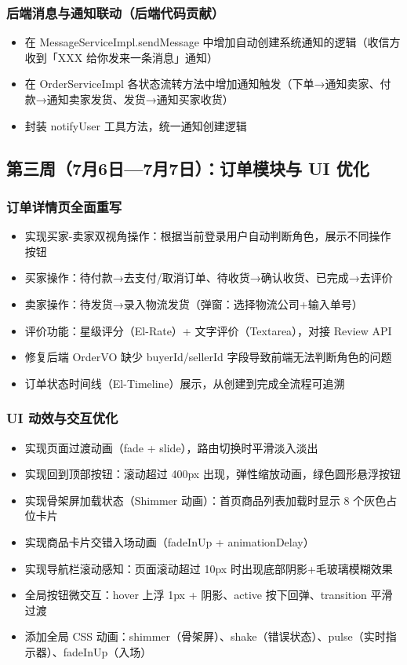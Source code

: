 \documentclass[12pt,a4paper]{ctexart}
\begin{document}
\subsubsection*{后端消息与通知联动（后端代码贡献）}
\begin{itemize}
    \item 在 MessageServiceImpl.sendMessage 中增加自动创建系统通知的逻辑（收信方收到「XXX 给你发来一条消息」通知）
    \item 在 OrderServiceImpl 各状态流转方法中增加通知触发（下单→通知卖家、付款→通知卖家发货、发货→通知买家收货）
    \item 封装 notifyUser 工具方法，统一通知创建逻辑
\end{itemize}

\subsection{第三周（7月6日—7月7日）：订单模块与 UI 优化}

\subsubsection*{订单详情页全面重写}
\begin{itemize}
    \item 实现买家-卖家双视角操作：根据当前登录用户自动判断角色，展示不同操作按钮
    \item 买家操作：待付款→去支付/取消订单、待收货→确认收货、已完成→去评价
    \item 卖家操作：待发货→录入物流发货（弹窗：选择物流公司+输入单号）
    \item 评价功能：星级评分（El-Rate）+ 文字评价（Textarea），对接 Review API
    \item 修复后端 OrderVO 缺少 buyerId/sellerId 字段导致前端无法判断角色的问题
    \item 订单状态时间线（El-Timeline）展示，从创建到完成全流程可追溯
\end{itemize}

\subsubsection*{UI 动效与交互优化}
\begin{itemize}
    \item 实现页面过渡动画（fade + slide），路由切换时平滑淡入淡出
    \item 实现回到顶部按钮：滚动超过 400px 出现，弹性缩放动画，绿色圆形悬浮按钮
    \item 实现骨架屏加载状态（Shimmer 动画）：首页商品列表加载时显示 8 个灰色占位卡片
    \item 实现商品卡片交错入场动画（fadeInUp + animationDelay）
    \item 实现导航栏滚动感知：页面滚动超过 10px 时出现底部阴影+毛玻璃模糊效果
    \item 全局按钮微交互：hover 上浮 1px + 阴影、active 按下回弹、transition 平滑过渡
    \item 添加全局 CSS 动画：shimmer（骨架屏）、shake（错误状态）、pulse（实时指示器）、fadeInUp（入场）
\end{itemize}
\end{document}
